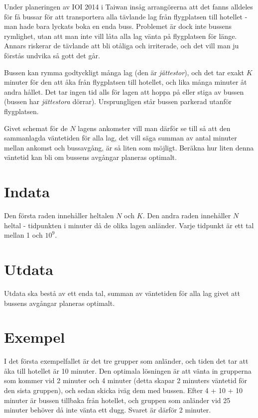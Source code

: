 
Under planeringen av IOI 2014 i Taiwan insåg arrangörerna att det fanns alldeles för få bussar för att transportera alla tävlande lag från flygplatsen till hotellet - man hade bara lyckats boka en enda buss. Problemet är dock inte bussens rymlighet, utan att man inte vill låta alla lag vänta på flygplatsen för länge. Annars riskerar de tävlande att bli otåliga och irriterade, och det vill man ju förstås undvika så gott det går.

Bussen kan rymma godtyckligt många lag (den är \emph{jättestor}), och det tar exakt $K$ minuter för den att åka från flygplatsen till hotellet, och lika många minuter åt andra hållet. Det tar ingen tid alls för lagen att hoppa på eller stiga av bussen (bussen har \emph{jättestora} dörrar). Ursprungligen står bussen parkerad utanför flygplatsen.

Givet schemat för de $N$ lagens ankomster vill man därför se till så att den sammanlagda väntetiden för alla lag, det vill säga summan av antal minuter mellan ankomst och bussavgång, är så liten som möjligt. Beräkna hur liten denna väntetid kan bli om bussens avgångar planeras optimalt.

\section*{Indata}
Den första raden innehåller heltalen $N$ och $K$.
Den andra raden innehåller $N$ heltal - tidpunkten i minuter då de olika lagen anländer. Varje tidpunkt är ett tal mellan 1 och $10^9$.

\section*{Utdata}
Utdata ska bestå av ett enda tal, summan av väntetiden för alla lag givet att bussens avgångar planeras optimalt.

\section*{Exempel}
I det första exempelfallet är det tre grupper som anländer, och tiden det tar att åka till hotellet är 10 minuter. Den optimala lösningen är att vänta in grupperna som kommer vid 2 minuter och 4 minuter (detta skapar 2 minuters väntetid för den sista gruppen), och sedan skicka iväg dem med bussen. Efter 4 + 10 + 10 minuter är bussen tillbaka från hotellet, och gruppen som anländer vid 25 minuter behöver då inte vänta ett dugg. Svaret är därför 2 minuter.

